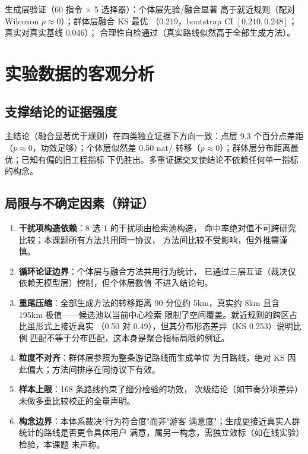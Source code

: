 \documentclass[UTF8,zihao=-4,a4paper]{ctexart}
\begin{document}
生成层验证（60 指令 $\times$ 5 选择器）：个体层先验/融合显著
高于就近规则（配对 Wilcoxon $p\approx0$）；群体层融合 KS 最优
（0.219，bootstrap CI $[0.210,0.248]$；真实对真实基线 0.046）；
合理性自检通过（真实路线似然高于全部生成方法）。

\section{实验数据的客观分析}

\subsection{支撑结论的证据强度}

主结论（融合显著优于规则）在四类独立证据下方向一致：点层 9.3
个百分点差距（$p\approx0$，功效足够）；个体层似然差 0.50 nat/
转移（$p\approx0$）；群体层分布距离最优；已知有偏的旧工程指标
下仍胜出。多重证据交叉使结论不依赖任何单一指标的构念。

\subsection{局限与不确定因素（辩证）}

\begin{enumerate}
  \item \textbf{干扰项构造依赖}：8 选 1 的干扰项由检索池构造，
        命中率绝对值不可跨研究比较；本课题所有方法共用同一协议，
        方法间比较不受影响，但外推需谨慎。
  \item \textbf{循环论证边界}：个体层与融合方法共用行为统计，
        已通过三层互证（裁决仅依赖无模型层）控制，但个体层数值
        不进入结论句。
  \item \textbf{重尾压缩}：全部生成方法的转移距离 90 分位约
        5km，真实约 8km 且含 195km 极值——候选池以当前中心检索
        限制了空间覆盖。就近规则的跨区占比虽形式上接近真实
        （0.50 对 0.49），但其分布形态差异（KS 0.253）说明比例
        匹配不等于分布匹配，这本身是聚合指标局限的例证。
  \item \textbf{粒度不对齐}：群体层参照为整条游记路线而生成单位
        为日路线，绝对 KS 因此偏大；方法间排序在同协议下有效。
  \item \textbf{样本上限}：168 条路线约束了细分检验的功效，
        次级结论（如节奏分项差异）未做多重比较校正的全量声明。
  \item \textbf{构念边界}：本体系裁决"行为符合度"而非"游客
        满意度"；生成更接近真实人群统计的路线是否更令具体用户
        满意，属另一构念，需独立效标（如在线实验）检验，本课题
        未声称。
\end{enumerate}
\end{document}
